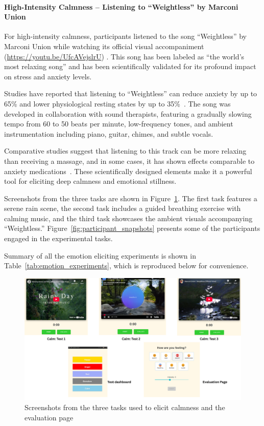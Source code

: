 \paragraph*{High-Intensity Calmness – Listening to “Weightless” by Marconi Union}

For high-intensity calmness, participants listened to the song “Weightless” by Marconi Union while watching its official visual accompaniment (\url{https://youtu.be/UfcAVejslrU}) \citep{justmusictv2015weightless}. This song has been labeled as “the world’s most relaxing song” and has been scientifically validated for its profound impact on stress and anxiety levels.

Studies have reported that listening to “Weightless” can reduce anxiety by up to 65\% and lower physiological resting states by up to 35\%~\citep{cooper2011study}. The song was developed in collaboration with sound therapists, featuring a gradually slowing tempo from 60 to 50 beats per minute, low-frequency tones, and ambient instrumentation including piano, guitar, chimes, and subtle vocals.

Comparative studies suggest that listening to this track can be more relaxing than receiving a massage, and in some cases, it has shown effects comparable to anxiety medications~\citep{psychologytoday_weightless}. These scientifically designed elements make it a powerful tool for eliciting deep calmness and emotional stillness.

Screenshots from the three tasks are shown in Figure~\ref{fig:calm_eval}. The first task features a serene rain scene, the second task includes a guided breathing exercise with calming music, and the third task showcases the ambient visuals accompanying “Weightless.” Figure~\ref{fig:participant_snapshots} presents some of the participants engaged in the experimental tasks.

Summary of all the emotion eliciting experiments is shown in Table~\ref{tab:emotion_experiments}, which is reproduced below for convenience.


\begin{figure}[h]
    \centering
    \includegraphics[width=1\textwidth]{img/chapter_03/calm_tests_eval.png}
    \caption{Screenshots from the three tasks used to elicit calmness and the evaluation page}
    \label{fig:calm_eval}
\end{figure}

